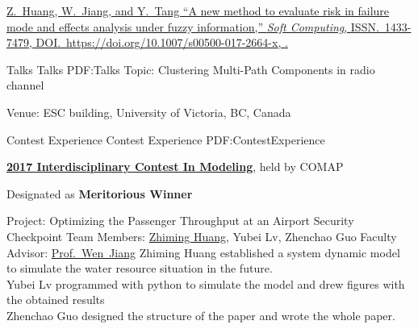 \documentclass[letterpaper,MMMyyyy,nonstopmode]{simpleresumecv}
\begin{document}
\begin{Body}
\Gap
\NumberedItem{[5]}
\href{http://www.example.com/my-paper-doi-4}
{\underline{Z.~Huang}, W.~Jiang, and Y.~Tang
``A new method to evaluate risk in failure mode and effects analysis under fuzzy information,''
\textit{Soft Computing},
ISSN.~1433-7479,
DOI.~https://doi.org/10.1007/s00500-017-2664-x,
.}

\endgroup

\BigGap
\SubSection
{Talks}
{Talks}
{PDF:Talks}
\BulletItem
Topic: Clustering Multi-Path Components in radio channel
\hfill
{}
\begin{Detail}
\SubBulletItem
Venue:
ESC building, University of Victoria, BC, Canada
\end{Detail}







\Section
{Contest Experience}
{Contest Experience}
{PDF:ContestExperience}

\Entry
\href{http://www.comap.com/undergraduate/contests/}
{\textbf{2017 Interdisciplinary Contest In Modeling}},
held by COMAP

\Gap
\BulletItem
Designated as \textbf{Meritorious Winner}
\hfill
\begin{Detail}
\SubBulletItem
Project:
Optimizing the Passenger Throughput at an Airport Security Checkpoint
\SubBulletItem
Team Members:
\underline{Zhiming Huang}, Yubei Lv, Zhenchao Guo
\SubBulletItem
Faculty Advisor:
\href{http://teacher.nwpu.edu.cn/jiangwen.html}
{Prof.~Wen~Jiang}
\SubBulletItem
Zhiming Huang established a system dynamic model to simulate the water resource situation in the future.\\
Yubei Lv programmed with python to simulate the model and drew figures with the obtained results\\
Zhenchao Guo designed the structure of the paper and wrote the whole paper.
\end{Detail}



\end{Body}
\end{document}

